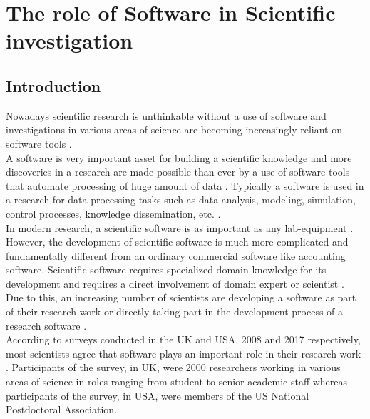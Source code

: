 \chapter{The role of Software in Scientific investigation}
\label{ch:Roles}

%

\section{Introduction}
\label{sec:Roles:intro}

Nowadays scientific research is unthinkable without a use of software and investigations in various areas of science are becoming increasingly reliant on software tools \citep{goble2014better, storer2017bridging, hannay2009scientists, jimenez2017four}. \\

A software is very important asset for building a scientific knowledge and more discoveries in a research are made possible than ever by a use of software tools that automate processing of huge amount of data \citep{jimenez2017four}. Typically a software is used in a research for data processing tasks such as data analysis, modeling, simulation, control processes, knowledge dissemination, etc. \citep{hannay2009scientists, pan2016disciplinary}. \\

In modern research, a scientific software is as important as any lab-equipment \citep{wilson2014best}. However, the development of scientific software is much more complicated and fundamentally different from an ordinary commercial software like accounting software. Scientific software requires specialized domain knowledge for its development and requires a direct involvement of domain expert or scientist \citep{wilson2014best, segal2008developing}. Due to this, an increasing number of scientists are developing a software as part of their research work or directly taking part in the development process of a research software \citep{jimenez2017four, kanewala2014testing}. \\

According to surveys conducted in the \ac{UK} and \ac{USA}, 2008 and 2017 respectively, most scientists agree that software plays an important role in their research work \citep{hettrick2014uk, nangia2017track}. Participants of the survey, in \ac{UK}, were 2000 researchers working in various areas of science in roles ranging from student to senior academic staff whereas participants of the survey, in \ac{USA}, were members of the US National Postdoctoral Association. \\
 

